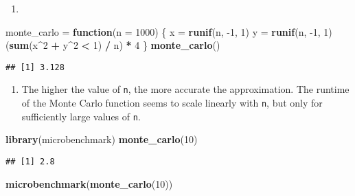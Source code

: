 \documentclass[
]{article}
\newenvironment{Shaded}{\begin{snugshade}}{\end{snugshade}}
\newcommand{\ControlFlowTok}[1]{\textcolor[rgb]{0.13,0.29,0.53}{\textbf{#1}}}
\newcommand{\DataTypeTok}[1]{\textcolor[rgb]{0.13,0.29,0.53}{#1}}
\newcommand{\DecValTok}[1]{\textcolor[rgb]{0.00,0.00,0.81}{#1}}
\newcommand{\KeywordTok}[1]{\textcolor[rgb]{0.13,0.29,0.53}{\textbf{#1}}}
\newcommand{\NormalTok}[1]{#1}
\newcommand{\OperatorTok}[1]{\textcolor[rgb]{0.81,0.36,0.00}{\textbf{#1}}}
\newcommand{\StringTok}[1]{\textcolor[rgb]{0.31,0.60,0.02}{#1}}
\providecommand{\tightlist}{%
  \setlength{\itemsep}{0pt}\setlength{\parskip}{0pt}}
\begin{document}
\begin{enumerate}
\def\labelenumi{\arabic{enumi}.}
\tightlist
\item
\end{enumerate}

\begin{Shaded}
\begin{Highlighting}[]
\NormalTok{monte\_carlo =}\StringTok{ }\ControlFlowTok{function}\NormalTok{(}\DataTypeTok{n =} \DecValTok{1000}\NormalTok{) \{}
\NormalTok{   x =}\StringTok{ }\KeywordTok{runif}\NormalTok{(n, }\DecValTok{{-}1}\NormalTok{, }\DecValTok{1}\NormalTok{)}
\NormalTok{   y =}\StringTok{ }\KeywordTok{runif}\NormalTok{(n, }\DecValTok{{-}1}\NormalTok{, }\DecValTok{1}\NormalTok{)}
\NormalTok{   (}\KeywordTok{sum}\NormalTok{(x}\OperatorTok{\^{}}\DecValTok{2} \OperatorTok{+}\StringTok{ }\NormalTok{y}\OperatorTok{\^{}}\DecValTok{2} \OperatorTok{\textless{}}\StringTok{ }\DecValTok{1}\NormalTok{) }\OperatorTok{/}\StringTok{ }\NormalTok{n) }\OperatorTok{*}\StringTok{ }\DecValTok{4}
\NormalTok{\}}
\KeywordTok{monte\_carlo}\NormalTok{()}
\end{Highlighting}
\end{Shaded}

\begin{verbatim}
## [1] 3.128
\end{verbatim}

\begin{enumerate}
\def\labelenumi{\arabic{enumi}.}
\setcounter{enumi}{1}
\tightlist
\item
  The higher the value of \texttt{n}, the more accurate the
  approximation. The runtime of the Monte Carlo function seems to scale
  linearly with \texttt{n}, but only for sufficiently large values of
  \texttt{n}.
\end{enumerate}

\begin{Shaded}
\begin{Highlighting}[]
\KeywordTok{library}\NormalTok{(microbenchmark)}
\KeywordTok{monte\_carlo}\NormalTok{(}\DecValTok{10}\NormalTok{)}
\end{Highlighting}
\end{Shaded}

\begin{verbatim}
## [1] 2.8
\end{verbatim}

\begin{Shaded}
\begin{Highlighting}[]
\KeywordTok{microbenchmark}\NormalTok{(}\KeywordTok{monte\_carlo}\NormalTok{(}\DecValTok{10}\NormalTok{))}
\end{Highlighting}
\end{Shaded}
\end{document}
